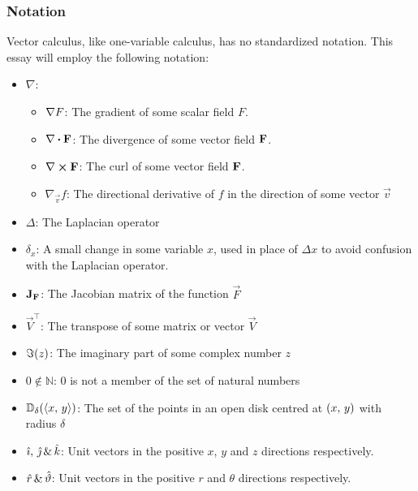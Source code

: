 \subsubsection{Notation}
Vector calculus, like one-variable calculus, has no standardized notation. This essay will employ the following
notation:
\begin{itemize}
	\item $\nabla$:
	\begin{itemize}
		\item $\nabla F$: The gradient of some scalar field $F$.
		\item $\divergence{\fatf}$: The divergence of some vector field $\mathbf{F}$.
		\item $\curl{\fatf}$: The curl of some vector field $\mathbf{F}$.
		\item $\nabla_\vec{v}f$: The directional derivative of $f$ in the direction of some vector $\vec{v}$
	\end{itemize}
	\item $\Delta$: The Laplacian operator
	\item $\delta_x$: A small change in some variable $x$, used in place of $\Delta x$ to avoid confusion with the Laplacian operator.
	\item $\mathbf{J}_{\mathbf{F}}$: The Jacobian matrix of the function $\vec{F}$
	\item $\vec{V}^\top$: The transpose of some matrix or vector $\vec{V}$
	\item $\imaginary(z)$: The imaginary part of some complex number $z$
	\item $0\notin\mathbb{N}$: $0$ is not a member of the set of natural numbers
	\item $\mathbb{D}_\delta(\langle x,\,y\rangle)$: The set of the points in an open disk centred at $\left(x,\,y\right)$ with radius $\delta$
	\item $\hat{\imath},\,\hat{\jmath}\,\&\,\hat{k}$: Unit vectors in the positive $x$, $y$ and $z$ directions respectively.
	\item $\hat{r}\,\&\,\hat{\vartheta}$: Unit vectors in the positive $r$ and $\theta$ directions respectively.
\end{itemize}

